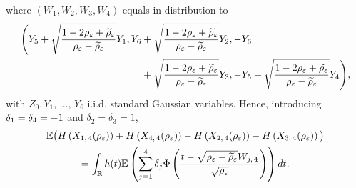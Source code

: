 \documentclass[AHL,Unicode,longabstracts,published]{cedram}
\newcommand{\R}{\mathbb{R}}
\newcommand{\E}{\mathbb{E}}
\newcommand{\eps}{\varepsilon}
\let\oldtilde\tilde
\renewcommand*{\tilde}[1]{\mathchoice{\widetilde{#1}}{\widetilde{#1}}{\oldtilde{#1}}{\oldtilde{#1}}}
\begin{document}
where $(W_1,W_2,W_3,W_4)$ equals in distribution to
\begin{align*}
\Bigg(Y_5+\sqrt{\frac{1-2\rho_\eps+\tilde{\rho}_\eps}{\rho_\eps-\tilde{\rho}_\eps}}Y_1,
Y_6 &+\sqrt{\frac{1-2\rho_\eps
+\tilde{\rho}_\eps}{\rho_\eps-\tilde{\rho}_\eps}}Y_2,-Y_6 \\
& +\sqrt{\frac{1-2\rho_\eps+\tilde{\rho}_\eps}{\rho_\eps-\tilde{\rho}_\eps}}Y_3,-Y_5+\sqrt{\frac{1-2\rho_\eps+\tilde{\rho}_\eps}{\rho_\eps-\tilde{\rho}_\eps}}Y_4\Bigg),
\end{align*}
with $Z_0,Y_1,\,\ldots,\,Y_6$ i.i.d. standard Gaussian variables. Hence, introducing $\delta_1=\delta_4\linebreak=-1$ and $\delta_2=\delta_3=1$,
\begin{multline*}
\E\big(H\left(X_{1,\,4}(\rho_\eps)\right)+H\left(X_{4,\,4}(\rho_\eps)\right)-H\left(X_{2,\,4}(\rho_\eps)\right)-H\left(X_{3,\,4}(\rho_\eps)\right)\big)
\\
=\int_\R h(t) \E\left(\sum_{j=1}^{4}\delta_j
\Phi\left(\frac{t-\sqrt{\rho_\eps-\tilde{\rho}_\eps}W_{j,\,4}}{\sqrt{\rho_\eps}}\right) \right)dt.
\end{multline*}
\end{document}

